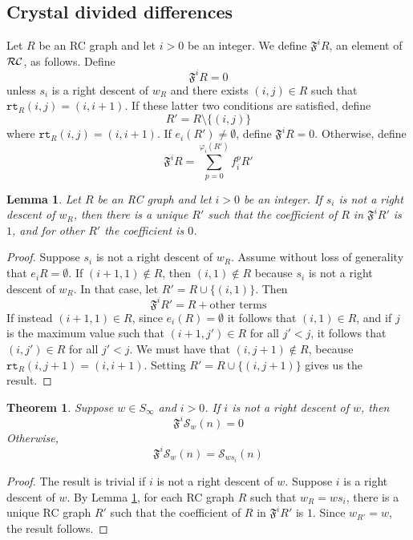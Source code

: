 \documentclass{amsart}
\newtheorem{lemma}{Lemma}[subsection]
\newtheorem{theorem}{Theorem}[section]
\theoremstyle{definition}
\theoremstyle{remark}
\numberwithin{equation}{subsection}
\newcommand{\wof}[1]{w_{#1}}
\newcommand{\rcdd}{\mathfrak{F}}
\newcommand{\rtt}{\mathtt{rt}}
\begin{document}
\subsection{Crystal divided differences}

Let $R$ be an RC graph and let $i>0$ be an integer. We define $\rcdd^iR$, an element of $\mathcal{RC}$, as follows. Define
$$\rcdd^iR=0$$
unless $s_i$ is a right descent of $\wof{R}$ and there exists $(i,j)\in R$ such that $\rtt_R(i, j) = (i, i+1)$. If these latter two conditions are satisfied, define 
$$R'=R\setminus \{(i, j)\}$$
where $\rtt_R(i,j) = (i, i+1)$. If $e_i(R')\neq \emptyset$, define $\rcdd^iR=0$. Otherwise, define
$$\rcdd^iR = \sum_{p=0}^{\varphi_i(R')}f_i^pR'$$
\begin{lemma} \label{lemma:divdiffunique}
	Let $R$ be an RC graph and let $i>0$ be an integer. If $s_i$ is not a right descent of $\wof{R}$, then there is a unique $R'$ such that the coefficient of $R$ in $\rcdd^iR'$ is $1$, and for other $R'$ the coefficient is $0$.
\end{lemma}
\begin{proof}
	Suppose $s_i$ is not a right descent of $\wof{R}$. Assume without loss of generality that $e_iR = \emptyset$. If $(i+1, 1)\notin R$, then $(i,1)\notin R$ because $s_i$ is not a right descent of $\wof{R}$. In that case, let $R' = R\cup\{(i,1)\}$. Then 
	$$\rcdd^iR' = R + \text{other terms}$$ 
	If instead $(i+1, 1)\in R$, since $e_i(R)=\emptyset$ it follows that $(i, 1)\in R$, and if $j$ is the maximum value such that $(i+1,j')\in R$ for all $j'<j$, it follows that $(i,j')\in R$ for all $j'<j$. We must have that $(i,j+1)\notin R$, because $\rtt_R(i, j+1)=(i, i+1)$. Setting $R'=R\cup \{(i, j+1)\}$ gives us the result.
\end{proof}

\begin{theorem} \label{theorem:divdiffschubert}
	Suppose $w\in S_\infty$ and $i >0$. If $i$ is not a right descent of $w$, then
	$$\rcdd^i\mathcal{S}_w(n) = 0$$
	Otherwise,
	$$\rcdd^i\mathcal{S}_w(n) = \mathcal{S}_{ws_i}(n)$$
\end{theorem}
\begin{proof}
	The result is trivial if $i$ is not a right descent of $w$. Suppose $i$ is a right descent of $w$. By Lemma \ref{lemma:divdiffunique}, for each RC graph $R$ such that $\wof{R} = ws_i$, there is a unique RC graph $R'$ such that the coefficient of $R$ in $\rcdd^iR'$ is $1$. Since $\wof{R'} = w$, the result follows.
\end{proof}
\end{document}
